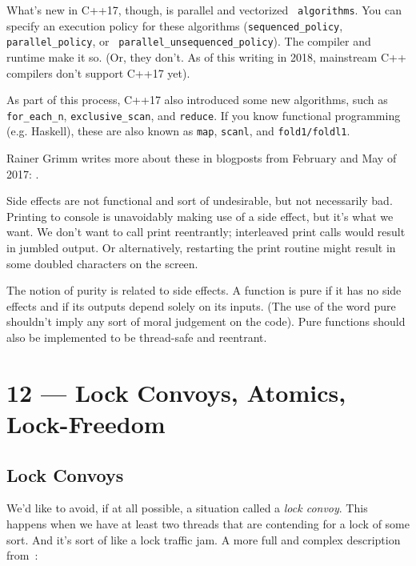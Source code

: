 \documentclass[a4paper]{report}
\begin{document}
What's new in C++17, though, is parallel and vectorized {\tt
algorithms}. You can specify an execution policy for these algorithms
({\tt sequenced\_policy}, {\tt parallel\_policy}, or {\tt
parallel\_unsequenced\_policy}). The compiler and runtime make it
so. (Or, they don't. As of this writing in 2018, mainstream C++
compilers don't support C++17 yet).

As part of this process, C++17 also introduced some new algorithms, such as
{\tt for\_each\_n}, {\tt exclusive\_scan}, and {\tt reduce}.
If you know functional programming (e.g. Haskell), these are also known as
{\tt map}, {\tt scanl}, and {\tt fold1/foldl1}.

Rainer Grimm writes more about these in blogposts from February and May of 2017:
\cite{grimm17:_paral_algor_stand_templ_librar} \cite{grimm17:_c}.

Side effects are not functional and sort of undesirable, but not necessarily bad. Printing to console is unavoidably making use of a side effect, but it's what we want. We don't want to call print reentrantly; interleaved print calls would result in jumbled output. Or alternatively, restarting the print routine might result in some doubled characters on the screen.

The notion of purity is related to side effects. A function is pure if it has no side effects and if its outputs depend solely on its inputs. (The use of the word pure shouldn't imply any sort of moral judgement on the code). Pure functions should also be implemented to be thread-safe and reentrant.










\chapter*{12 --- Lock Convoys, Atomics, Lock-Freedom}


\section*{Lock Convoys}

We'd like to avoid, if at all possible, a situation called a \textit{lock convoy}. This happens when we have at least two threads that are contending for a lock of some sort. And it's sort of like a lock traffic jam. A more full and complex description from~\cite{lockconvoys}:
\end{document}
